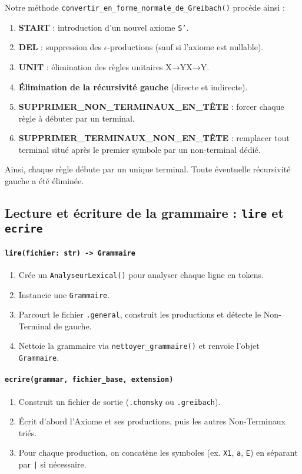 \documentclass[a4paper,12pt]{article}
\begin{document}
Notre méthode \texttt{convertir\_en\_forme\_normale\_de\_Greibach()} procède ainsi :
\begin{enumerate}
    \item \textbf{START} : introduction d’un nouvel axiome \texttt{S'}.
    \item \textbf{DEL} : suppression des \(\epsilon\)-productions (sauf si l’axiome est nullable).
    \item \textbf{UNIT} : élimination des règles unitaires X→YX→Y.
    \item \textbf{Élimination de la récursivité gauche} (directe et indirecte).
    \item\textbf{SUPPRIMER\_NON\_TERMINAUX\_EN\_TÊTE} : forcer chaque règle à débuter par un terminal.
    \item \textbf{SUPPRIMER\_TERMINAUX\_NON\_EN\_TÊTE} : remplacer tout terminal situé après le premier symbole par un non-terminal dédié.
\end{enumerate}

Ainsi, chaque règle débute par un unique terminal. Toute éventuelle récursivité gauche a été éliminée.

\subsection{Lecture et écriture de la grammaire : \texttt{lire} et \texttt{ecrire}}
\label{subsec:lire-ecrire}

\paragraph{\texttt{lire(fichier: str) -> Grammaire}} 
\begin{enumerate}
    \item Crée un \texttt{AnalyseurLexical()} pour analyser chaque ligne en tokens.
    \item Instancie une \texttt{Grammaire}.
    \item Parcourt le fichier \texttt{.general}, construit les productions et détecte le Non-Terminal de gauche.
    \item Nettoie la grammaire via \texttt{nettoyer\_grammaire()} et renvoie l’objet \texttt{Grammaire}.
\end{enumerate}

\paragraph{\texttt{ecrire(grammar, fichier\_base, extension)}} 
\begin{enumerate}
    \item Construit un fichier de sortie (\texttt{.chomsky} ou \texttt{.greibach}).
    \item Écrit d’abord l’Axiome et ses productions, puis les autres Non-Terminaux triés.
    \item Pour chaque production, on concatène les symboles (ex. \texttt{X1}, \texttt{a}, \texttt{E}) en séparant par \texttt{|} si nécessaire.
\end{enumerate}
\end{document}
